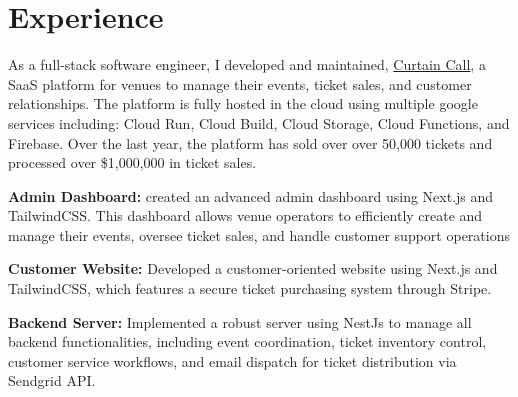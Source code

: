 \documentclass[]{deedy-resume-openfont}
\begin{document}
\hfill
\begin{minipage}[t]{0.66\textwidth} 
	\vspace{-.2in}


\section{Experience}

\vspace{.05in} %
    As a full-stack software engineer, I developed and maintained, 
    \href{https://curtaincalltickets.com}{Curtain Call}, a
    SaaS platform for venues to manage their events, ticket sales, and customer
    relationships. The platform is fully hosted in the cloud using multiple
    google services including: Cloud Run, Cloud Build, Cloud Storage, Cloud
    Functions, and Firebase. Over the last year, the platform has sold over
    over 50,000 tickets and processed over \$1,000,000 in ticket sales.
\vspace{.15in} %
\begin{tightemize}
\item {\selectfont\bfseries Admin Dashboard:}
created an advanced admin dashboard using Next.js and TailwindCSS. This
    dashboard allows venue operators to efficiently create and manage their
    events, oversee ticket sales, and handle customer support operations
	\vspace{.05in} %
\item {\selectfont\bfseries Customer Website:}
    Developed a customer-oriented website using Next.js and TailwindCSS, which
    features a secure ticket purchasing system through Stripe.
	\vspace{.05in} %
\item {\selectfont\bfseries Backend Server:}
    Implemented a robust server using NestJs to manage all backend
    functionalities, including event coordination, ticket inventory control,
    customer service workflows, and email dispatch for ticket distribution via
    Sendgrid API.

\end{tightemize}
\end{minipage}
\end{document}
